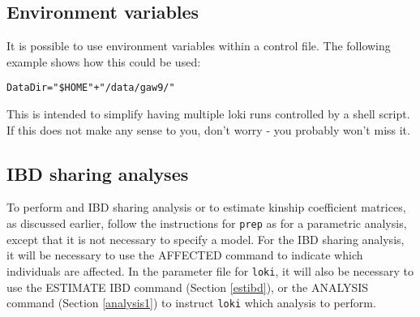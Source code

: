 \documentclass[10pt,a4paper]{article}
\newcommand{\Prep}{\texttt{prep}\xspace}
\newcommand{\Loki}{\texttt{loki}\xspace}
\begin{document}
\subsection{Environment variables}
It is possible to use environment variables within a control file.  The
following example shows how this could be used:
\begin{verbatim}
DataDir="$HOME"+"/data/gaw9/"
\end{verbatim}
This is intended to simplify having multiple loki runs controlled by a shell
script.  If this does not make any sense to you, don't worry - you probably
won't miss it.
\subsection{IBD sharing analyses}
To perform and IBD sharing analysis or to estimate kinship coefficient
matrices, as discussed earlier, follow the instructions for \Prep as for a
parametric analysis, except that it is not necessary to specify a model.
For the IBD sharing analysis, it will be necessary to use the AFFECTED
command to indicate which individuals are affected.  In the parameter file
for \Loki, it will also be necessary to use the ESTIMATE IBD command
(Section \ref{estibd}), or the  ANALYSIS command (Section \ref{analysis1})
to instruct \Loki which analysis to perform. 
\end{document}
